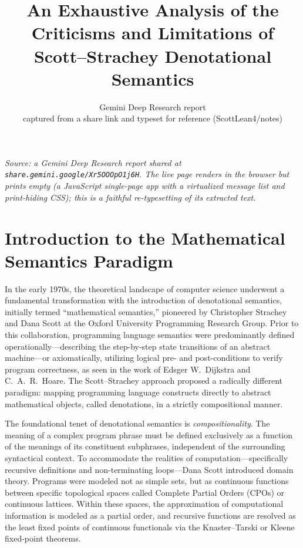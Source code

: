 \documentclass[11pt]{article}
\title{\bfseries An Exhaustive Analysis of the Criticisms and Limitations of
       Scott--Strachey Denotational Semantics}
\author{Gemini Deep Research report \\ \small captured from a share link and typeset for reference (ScottLean4/notes)}
\date{}
\begin{document}
\maketitle

\begin{center}\small\itshape
Source: a Gemini Deep Research report shared at \texttt{share.gemini.google/Xr5OOOpO1j6H}.
The live page renders in the browser but prints empty (a JavaScript single-page app
with a virtualized message list and print-hiding CSS); this is a faithful re-typesetting
of its extracted text.
\end{center}

\section{Introduction to the Mathematical Semantics Paradigm}

In the early 1970s, the theoretical landscape of computer science underwent a
fundamental transformation with the introduction of denotational semantics,
initially termed ``mathematical semantics,'' pioneered by Christopher Strachey and
Dana Scott at the Oxford University Programming Research Group. Prior to this
collaboration, programming language semantics were predominantly defined
operationally---describing the step-by-step state transitions of an abstract
machine---or axiomatically, utilizing logical pre- and post-conditions to verify
program correctness, as seen in the work of Edsger W.\ Dijkstra and C.\ A.\ R.\ Hoare.
The Scott--Strachey approach proposed a radically different paradigm: mapping
programming language constructs directly to abstract mathematical objects, called
denotations, in a strictly compositional manner.

The foundational tenet of denotational semantics is \emph{compositionality}. The
meaning of a complex program phrase must be defined exclusively as a function of the
meanings of its constituent subphrases, independent of the surrounding syntactical
context. To accommodate the realities of computation---specifically recursive
definitions and non-terminating loops---Dana Scott introduced domain theory.
Programs were modeled not as simple sets, but as continuous functions between
specific topological spaces called Complete Partial Orders (CPOs) or continuous
lattices. Within these spaces, the approximation of computational information is
modeled as a partial order, and recursive functions are resolved as the least fixed
points of continuous functionals via the Knaster--Tarski or Kleene fixed-point
theorems.
\end{document}
